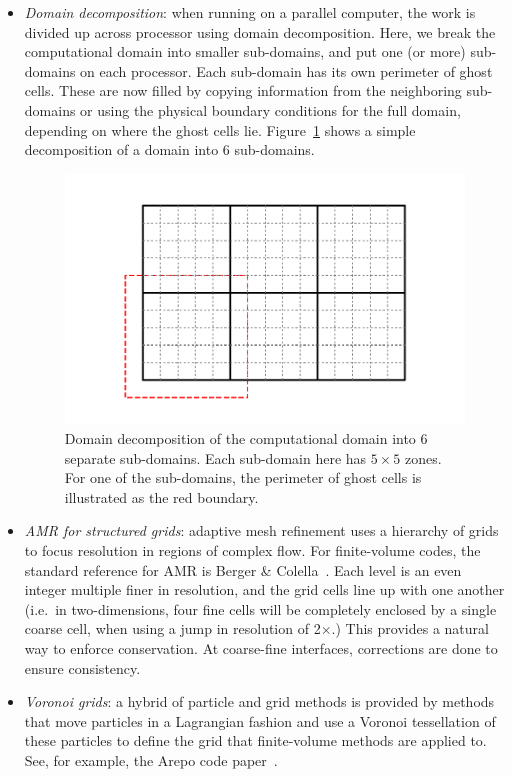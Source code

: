 \begin{itemize}

\item {\em Domain decomposition}: when running on a parallel computer,
 the work is divided up across processor using domain decomposition.
 Here, we break the computational domain into smaller sub-domains, and
 put one (or more) sub-domains on each processor.  Each sub-domain
 has its own perimeter of ghost cells.  These are now filled by copying
 information from the neighboring sub-domains or using the physical
 boundary conditions for the full domain, depending on where the
 ghost cells lie.  Figure~\ref{fig:domain} shows a simple decomposition of
 a domain into 6 sub-domains.

 \begin{figure}
 \centering
 \includegraphics[width=\linewidth]{domain}
 \caption[Domain decomposition example] {\label{fig:domain} Domain
   decomposition of the computational domain into 6 separate
   sub-domains.  Each sub-domain here has $5\times 5$ zones.  For one
   of the sub-domains, the perimeter of ghost cells is illustrated as
   the red boundary.}
 \end{figure}

\item {\em AMR for structured grids}: adaptive mesh refinement uses a
  hierarchy of grids to focus resolution in regions of complex flow.
  For finite-volume codes, the standard reference for AMR is Berger \&
  Colella~\cite{berger-colella}.  Each level is an even integer
  multiple finer in resolution, and the grid cells line up with one
  another (i.e.\ in two-dimensions, four fine cells will be completely
  enclosed by a single coarse cell, when using a jump in resolution of
  2$\times$.)  This provides a natural way to enforce conservation.
  At coarse-fine interfaces, corrections are done to ensure
  consistency.

\item {\em Voronoi grids}: a hybrid of particle and grid methods is
  provided by methods that move particles in a Lagrangian fashion and
  use a Voronoi tessellation of these particles to define the grid
  that finite-volume methods are applied to.  See, for example,
  the Arepo code paper~\cite{arepo}.
\end{itemize}
